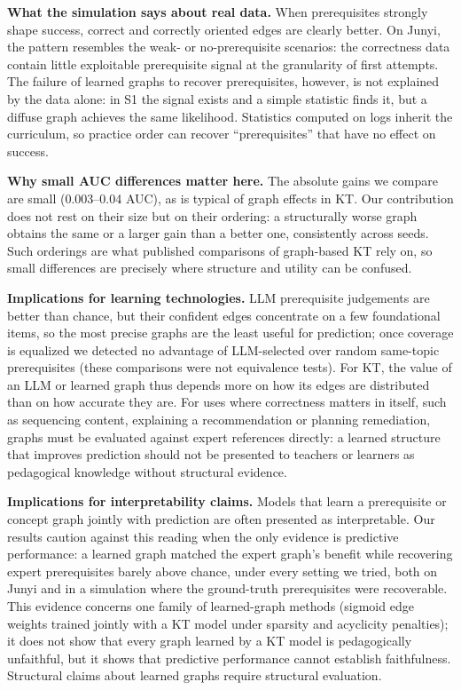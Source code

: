 \documentclass[lettersize,journal]{IEEEtran}
\begin{document}
\textbf{What the simulation says about real data.} When prerequisites strongly shape success, correct and correctly oriented edges are clearly better. On Junyi, the pattern resembles the weak- or no-prerequisite scenarios: the correctness data contain little exploitable prerequisite signal at the granularity of first attempts. The failure of learned graphs to recover prerequisites, however, is not explained by the data alone: in S1 the signal exists and a simple statistic finds it, but a diffuse graph achieves the same likelihood. Statistics computed on logs inherit the curriculum, so practice order can recover ``prerequisites'' that have no effect on success.

\textbf{Why small AUC differences matter here.} The absolute gains we compare are small (0.003--0.04 AUC), as is typical of graph effects in KT. Our contribution does not rest on their size but on their ordering: a structurally worse graph obtains the same or a larger gain than a better one, consistently across seeds. Such orderings are what published comparisons of graph-based KT rely on, so small differences are precisely where structure and utility can be confused.

\textbf{Implications for learning technologies.} LLM prerequisite judgements are better than chance, but their confident edges concentrate on a few foundational items, so the most precise graphs are the least useful for prediction; once coverage is equalized we detected no advantage of LLM-selected over random same-topic prerequisites (these comparisons were not equivalence tests). For KT, the value of an LLM or learned graph thus depends more on how its edges are distributed than on how accurate they are. For uses where correctness matters in itself, such as sequencing content, explaining a recommendation or planning remediation, graphs must be evaluated against expert references directly: a learned structure that improves prediction should not be presented to teachers or learners as pedagogical knowledge without structural evidence.

\textbf{Implications for interpretability claims.} Models that learn a prerequisite or concept graph jointly with prediction are often presented as interpretable. Our results caution against this reading when the only evidence is predictive performance: a learned graph matched the expert graph's benefit while recovering expert prerequisites barely above chance, under every setting we tried, both on Junyi and in a simulation where the ground-truth prerequisites were recoverable. This evidence concerns one family of learned-graph methods (sigmoid edge weights trained jointly with a KT model under sparsity and acyclicity penalties); it does not show that every graph learned by a KT model is pedagogically unfaithful, but it shows that predictive performance cannot establish faithfulness. Structural claims about learned graphs require structural evaluation.
\end{document}
